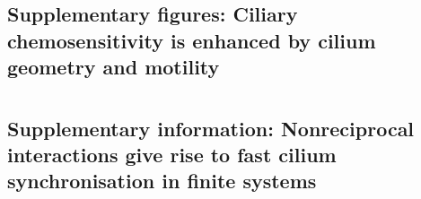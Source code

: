 \chapter[Appendix A]{\phantom{X}}

\hspace{0pt}
\vfill
\begin{fullwidth}
    \section{Supplementary figures: Ciliary chemosensitivity is enhanced by cilium geometry and motility}
\end{fullwidth}
\vfill
\hspace{0pt}






\chapter[Appendix B]{\phantom{X}}

\hspace{0pt}
\vfill
\begin{fullwidth}
    \section{Supplementary information: Nonreciprocal interactions give rise to fast cilium synchronisation in finite systems}
\end{fullwidth}
\vfill
\hspace{0pt}





